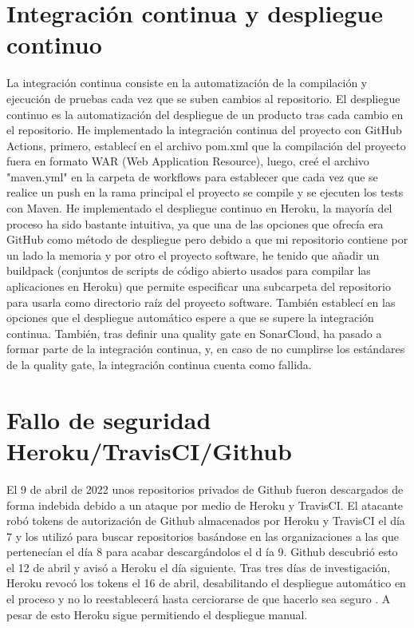 \section{Integración continua y despliegue continuo}
La integración continua consiste en la automatización de la compilación y ejecución de pruebas cada vez que se suben cambios al repositorio.
El despliegue continuo es la automatización del despliegue de un producto tras cada cambio en el repositorio.
He implementado la integración continua del proyecto con GitHub Actions, primero, establecí en el archivo pom.xml que la compilación del proyecto fuera en formato WAR (Web Application Resource), luego, creé el archivo "maven.yml" en la carpeta de workflows para establecer que cada vez que se realice un push en la rama principal el proyecto se compile y se ejecuten los tests con Maven.
He implementado el despliegue continuo en Heroku, la mayoría del proceso ha sido bastante intuitiva, ya que una de las opciones que ofrecía era GitHub como método de despliegue pero debido a que mi repositorio contiene por un lado la memoria y por otro el proyecto software, he tenido que añadir un buildpack (conjuntos de scripts de código abierto usados para compilar las aplicaciones en Heroku) que permite especificar una subcarpeta del repositorio para usarla como directorio raíz del proyecto software. También establecí en las opciones que el despliegue automático espere a que se supere la integración continua. También, tras definir una quality gate en SonarCloud, ha pasado a formar parte de la integración continua, y, en caso de no cumplirse los estándares de la quality gate, la integración continua cuenta como fallida.

\section{Fallo de seguridad Heroku/TravisCI/Github}
El 9 de abril de 2022 unos repositorios privados de Github fueron descargados de forma indebida debido a un ataque por medio de Heroku y TravisCI. El atacante robó tokens de autorización de Github almacenados por Heroku y TravisCI el día 7 y los utilizó para buscar repositorios basándose en las organizaciones a las que pertenecían el día 8 para acabar descargándolos el d
ía 9. Github descubrió esto el 12 de abril y avisó a Heroku el día siguiente. Tras tres días de investigación, Heroku revocó los tokens el 16 de abril, desabilitando el despliegue automático en el proceso y no lo reestablecerá hasta cerciorarse de que hacerlo sea seguro \cite{githubsecurity-2022} \cite{herokusecurity-2022}. A pesar de esto Heroku sigue permitiendo el despliegue manual.

